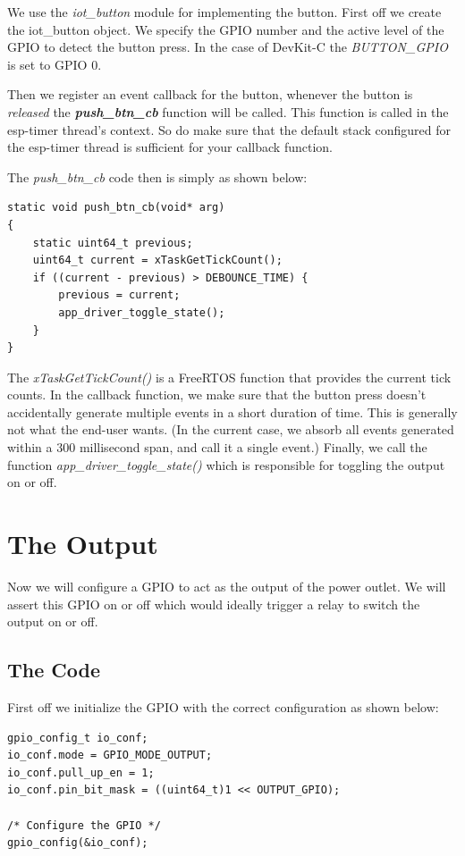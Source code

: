 \documentclass[11pt,fleqn]{book} %
\begin{document}
We use the \textit{iot\_button} module for implementing the button. 
First off we create the iot\_button object. We specify the GPIO number and the active level of the GPIO to detect the button press. In the case of DevKit-C the \textit{BUTTON\_GPIO} is set to GPIO 0. 

Then we register an event callback for the button, whenever the button is \textit{released} the \textit{\textbf{push\_btn\_cb}} function will be called. This function is called in the esp-timer thread's context. So do make sure that the default stack configured for the esp-timer thread is sufficient for your callback function.

The \textit{push\_btn\_cb} code then is simply as shown below:
\begin{verbatim}
static void push_btn_cb(void* arg)
{
    static uint64_t previous;
    uint64_t current = xTaskGetTickCount();
    if ((current - previous) > DEBOUNCE_TIME) {
        previous = current;
        app_driver_toggle_state();
    }
}
\end{verbatim}

The \textit{xTaskGetTickCount()} is a FreeRTOS function that provides the current tick counts. In the callback function, we make sure that the button press doesn't accidentally generate multiple events in a short duration of time. This is generally not what the end-user wants. (In the current case, we absorb all events generated within a 300 millisecond span, and call it a single event.)
Finally, we call the function \textit{app\_driver\_toggle\_state()} which is responsible for toggling the output on or off.

\section{The Output}
Now we will configure a GPIO to act as the output of the power outlet. We will assert this GPIO on or off which would ideally trigger a relay to switch the output on or off.

\subsection{The Code}\label{sec:relay}
First off we initialize the GPIO with the correct configuration as shown below:

\begin{verbatim}
gpio_config_t io_conf;
io_conf.mode = GPIO_MODE_OUTPUT;
io_conf.pull_up_en = 1;
io_conf.pin_bit_mask = ((uint64_t)1 << OUTPUT_GPIO);

/* Configure the GPIO */
gpio_config(&io_conf);

\end{verbatim}
\end{document}
